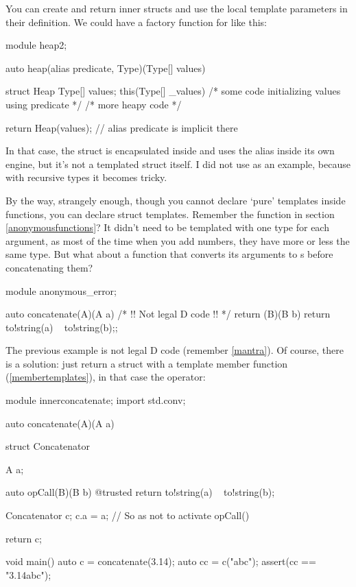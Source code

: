 You can create and return inner structs and use the local template parameters in their definition. We could have a factory function for  like this:

\begin{dcode}
module heap2;

auto heap(alias predicate, Type)(Type[] values)
{
    struct Heap
    {
        Type[] values;
        this(Type[] _values)
        {
            /* some code initializing values using predicate */
        }
        /* more heapy code */
    }

    return Heap(values); // alias predicate is implicit there
}
\end{dcode}

In that case, the  struct is encapsulated inside  and uses the  alias inside its own engine, but it's not a templated struct itself. I did not use  as an example, because with recursive types it becomes tricky.

By the way, strangely enough, though you cannot declare `pure' templates inside functions, you can declare struct templates. Remember the  function in section \ref{anonymousfunctions}? It didn't need to be templated with one type for each argument, as most of the time when you add numbers, they have more or less the same type. But what about a function that converts its arguments to s before concatenating them?

\begin{dcode}
module anonymous_error;

auto concatenate(A)(A a)
{
    /* !! Not legal D code !! */
    return (B)(B b) { return to!string(a) ~ to!string(b);};
}
\end{dcode}

The previous example is not legal D code (remember \ref{mantra}). Of course, there is a solution: just return a struct with a template member function (\ref{membertemplates}), in that case the  operator:

\begin{dcode}
module innerconcatenate;
import std.conv;

auto concatenate(A)(A a)
{
    struct Concatenator 
    {
        A a;

        auto opCall(B)(B b) @trusted
        {
            return to!string(a) ~ to!string(b);
        }
    }

    Concatenator c;
    c.a = a; // So as not to activate opCall()

    return c;
}

void main()
{
    auto c = concatenate(3.14);
    auto cc = c("abc");
    assert(cc == "3.14abc");
}
\end{dcode}

